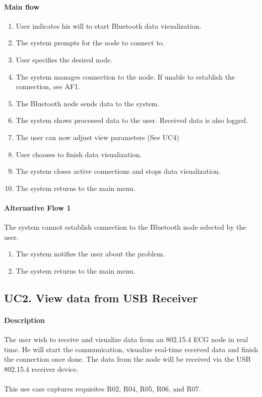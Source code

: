 			\paragraph{Main flow}
				\begin{enumerate}
				\item User indicates his will to start Bluetooth data visualization.
				\item The system prompts for the node to connect to.
				\item User specifies the desired node.
				\item The system manages connection to the node. If unable to establish the connection, see AF1.
				\item The Bluetooth node sends data to the system.
				\item The system shows processed data to the user. Received data is also logged.
				\item The user can now adjust view parameters (See UC4)
				\item User chooses to finish data visualization.
				\item The system closes active connections and stops data visualization.
				\item The system returns to the main menu.
				\end{enumerate}

			\paragraph{Alternative Flow 1} The system cannot establish connection to the Bluetooth node selected by the user.
				\begin{enumerate}
				\item The system notifies the user about the problem.
				\item The system returns to the main menu.
				\end{enumerate}

		\subsection{UC2. View data from USB Receiver}

			\paragraph{Description} The user wish to receive and visualize data from 	an 802.15.4 ECG node in real time. He will start the communication, visualize real-time received data and finish the connection once done. The data from the node will be received via the USB 802.15.4 receiver device.\\
			\\This use case captures requisites R02, R04, R05, R06, and R07.

